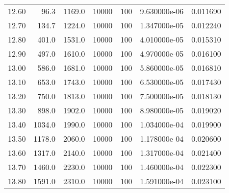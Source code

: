 \begin{tabular}{rrrrrrr}
 12.60 &     96.3 &   1169.0 & 10000 & 100 & 9.630000e-06 & 0.011690 \\
 12.70 &    134.7 &   1224.0 & 10000 & 100 & 1.347000e-05 & 0.012240 \\
 12.80 &    401.0 &   1531.0 & 10000 & 100 & 4.010000e-05 & 0.015310 \\
 12.90 &    497.0 &   1610.0 & 10000 & 100 & 4.970000e-05 & 0.016100 \\
 13.00 &    586.0 &   1681.0 & 10000 & 100 & 5.860000e-05 & 0.016810 \\
 13.10 &    653.0 &   1743.0 & 10000 & 100 & 6.530000e-05 & 0.017430 \\
 13.20 &    750.0 &   1813.0 & 10000 & 100 & 7.500000e-05 & 0.018130 \\
 13.30 &    898.0 &   1902.0 & 10000 & 100 & 8.980000e-05 & 0.019020 \\
 13.40 &   1034.0 &   1990.0 & 10000 & 100 & 1.034000e-04 & 0.019900 \\
 13.50 &   1178.0 &   2060.0 & 10000 & 100 & 1.178000e-04 & 0.020600 \\
 13.60 &   1317.0 &   2140.0 & 10000 & 100 & 1.317000e-04 & 0.021400 \\
 13.70 &   1460.0 &   2230.0 & 10000 & 100 & 1.460000e-04 & 0.022300 \\
 13.80 &   1591.0 &   2310.0 & 10000 & 100 & 1.591000e-04 & 0.023100 \\
\bottomrule
\end{tabular}
